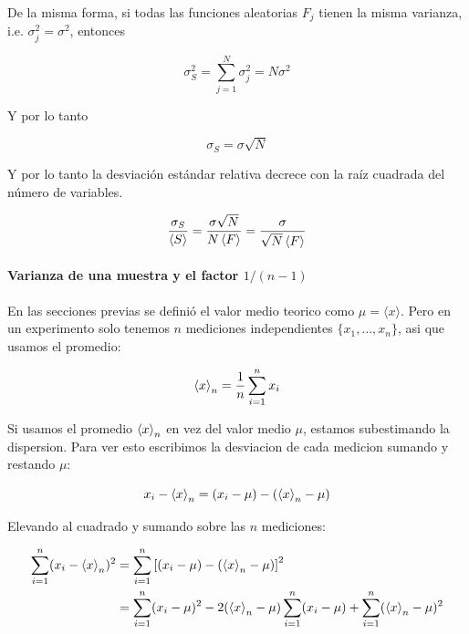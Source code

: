 De la misma forma, si todas las funciones aleatorias $F_j$ tienen la misma
varianza, i.e. $\sigma^2_j = \sigma^2$, entonces

\begin{equation}
  \sigma^2_S = \sum_{j=1}^N \sigma^2_j = N \sigma^2
  \label{eq:var-s-eq}
\end{equation}

Y por lo tanto

\begin{equation}
  \sigma_S = \sigma\sqrt{N}
  \label{eq:std-s-eq}
\end{equation}

Y por lo tanto la desviación estándar relativa decrece con la raíz
cuadrada del número de variables.

\begin{equation}
  \frac{\sigma_S}{\left\langle S \right\rangle} = \frac{\sigma\sqrt{N}}{N\left\langle F \right\rangle}
  = \frac{\sigma}{\sqrt{N}\left\langle F \right\rangle}
  \label{eq:std-relative}
\end{equation}

\paragraph{Varianza de una muestra y el factor
\texorpdfstring{$1/(n-1)$}{1/(n-1)}}

En las secciones previas se definió el valor medio teorico como $\mu
= \langle x \rangle$. Pero en un experimento solo tenemos $n$
mediciones independientes $\{x_1, \dots, x_n\}$, asi que usamos el promedio:

\begin{equation}
  \left\langle x \right\rangle_n = \frac{1}{n} \sum_{i=1}^n x_i
  \label{eq:media-muestral}
\end{equation}

Si usamos el promedio $\left\langle x \right\rangle_n$ en vez del valor medio $\mu$, estamos
subestimando la dispersion. Para ver esto escribimos la desviacion de
cada medicion sumando y restando $\mu$:

\begin{equation}
  x_i - \left\langle x \right\rangle_n = (x_i - \mu) - (\left\langle x \right\rangle_n - \mu)
\end{equation}

Elevando al cuadrado y sumando sobre las $n$ mediciones:

\begin{align}
  \sum_{i=1}^n (x_i - \left\langle x \right\rangle_n)^2 &= \sum_{i=1}^n \left[ (x_i - \mu) -
  (\left\langle x \right\rangle_n - \mu) \right]^2 \nonumber \\
  &= \sum_{i=1}^n (x_i - \mu)^2 - 2(\left\langle x \right\rangle_n - \mu) \sum_{i=1}^n (x_i
  - \mu) + \sum_{i=1}^n (\left\langle x \right\rangle_n - \mu)^2
\end{align}

